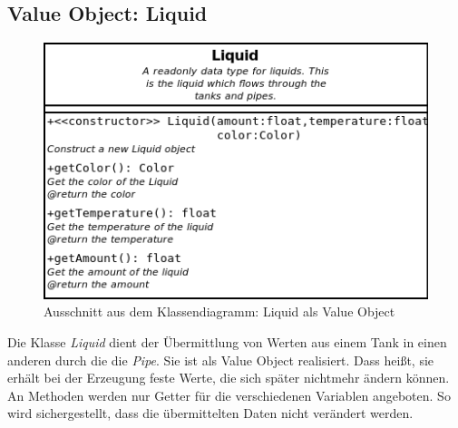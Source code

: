 \documentclass[parskip=full]{scrartcl}
\begin{document}
\subsection{Value Object: Liquid}
\begin{figure}[H]
  \centering
  \includegraphics[scale=0.5]{design/pattern-screenshots/value-Liquid.png}
  \caption{Ausschnitt aus dem Klassendiagramm: Liquid als Value Object}
\end{figure}
Die Klasse \emph{Liquid} dient der \"Ubermittlung von Werten aus einem Tank in einen anderen durch die die \emph{Pipe}. Sie ist als Value Object realisiert.
Dass hei{\ss}t, sie erh\"alt bei der Erzeugung feste Werte, die sich sp\"ater nichtmehr \"andern k\"onnen. An Methoden werden nur Getter f\"ur die
verschiedenen Variablen angeboten. So wird sichergestellt, dass die \"ubermittelten Daten nicht ver\"andert werden.

\pagebreak
{}
{}
\listoffigures
\end{document}
